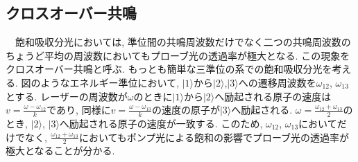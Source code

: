 \documentclass[uplatex, dvipdfmx, a4paper, report, papersize, 11pt]{jsbook}
\begin{document}
\subsection{クロスオーバー共鳴}
　飽和吸収分光においては, 準位間の共鳴周波数だけでなく二つの共鳴周波数のちょうど平均の周波数においてもプローブ光の透過率が極大となる. この現象をクロスオーバー共鳴と呼ぶ. もっとも簡単な三準位の系での飽和吸収分光を考える. 図のようなエネルギー準位において, $|1\rangle$から$|2\rangle$,$|3\rangle$への遷移周波数を$\omega_{12}$, $\omega_{13}$とする. レーザーの周波数が$\omega$のときに$|1\rangle$から$|2\rangle$へ励起される原子の速度は$v = \frac{\omega - \omega_{12}}{k}$であり, 同様に$v = \frac{\omega - \omega_{13}}{k}$の速度の原子が$|3\rangle$へ励起される.
$\omega = \frac{\omega_{12} + \omega_{13}}{2}$のとき, $|2\rangle$, $|3\rangle$へ励起される原子の速度が一致する. このため, $\omega_12$, $\omega_13$においてだけでなく, $\frac{\omega_{12} + \omega_{13}}{2}$においてもポンプ光による飽和の影響でプローブ光の透過率が極大となることが分かる.
\end{document}
